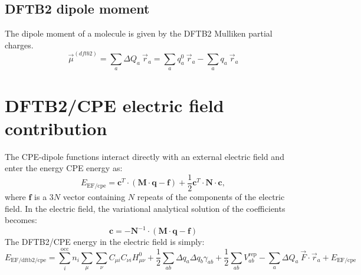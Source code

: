 \documentclass{article}
\numberwithin{equation}{section}
\begin{document}
\subsection{DFTB2 dipole moment}
The dipole moment of a molecule is given by the DFTB2 Mulliken partial charges.
\begin{equation}
    \vec{\mu}^{(dftb2)} = \sum_a \Delta Q_a\ \vec{r}_a = \sum_a q^0_a\ \vec{r}_a - \sum_a q_a\ \vec{r}_a 
\end{equation}


\section{DFTB2/CPE electric field contribution}
The CPE-dipole functions interact directly with an external electric field and enter the energy CPE energy as:
\begin{equation}
    E_{\mathrm{EF/cpe}} = \mathbf{c}^T \cdot \left( \mathbf{M} \cdot \mathbf{q} - \mathbf{f} \right) + \frac{1}{2} \mathbf{c}^T \cdot \mathbf{N} \cdot \mathbf{c},
\end{equation}
where $\mathbf{f}$ is a $3N$ vector containing $N$ repeats of the components of the electric field.
In the electric field, the variational analytical solution of the coefficients becomes:
\begin{equation}
    \mathbf{c}= -\mathbf{N}^{-1} \cdot \left(\mathbf{M} \cdot \mathbf{q} - \mathbf{f} \right)
\end{equation}
The DFTB2/CPE energy in the electric field is simply:
\begin{equation}
  E_\mathrm{EF/dftb2/cpe} 
= \sum_i^\mathrm{occ} n_i  \sum_\mu \sum_\nu C_{\mu i}  C_{\nu i} H^0_{\mu\nu} + \frac{1}{2} \sum_{ab} \Delta q_a \Delta q_b \gamma_{ab}+ \frac{1}{2} \sum_{ab} V^\mathrm{rep}_{ab} - \sum_a \Delta Q_a\ \vec{F} \cdot \vec{r}_a + E_{\mathrm{EF/cpe}}
\end{equation}
\end{document}
